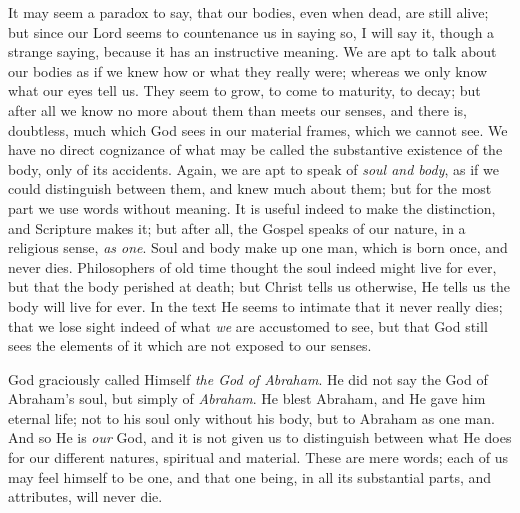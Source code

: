 It may seem a paradox to say, that our bodies, even when dead, are still alive; but since our Lord seems to
countenance us in saying so, I will say it, though a
strange saying, because it has an instructive meaning. We
are apt to talk about our bodies as if we knew how or
what they really were; whereas we only know what our eyes
tell us. They seem to grow, to come to maturity, to
decay; but after all we know no more about them than
meets our senses, and there is, doubtless, much which God
sees in our material frames, which we cannot see. We have
no direct cognizance of what may be called the
substantive existence of the body, only of its accidents.
Again, we are apt to speak of \emph{soul and body}, as if
we could distinguish between them, and knew much about
them; but for the most part we use words without meaning.
It is useful indeed to make the distinction, and
Scripture makes it; but after all, the Gospel speaks of
our nature, in a religious sense, \emph{as one}. Soul and
body make up one man, which is born once, and never dies.
Philosophers of old time thought the soul indeed might
live for ever, but that the body perished at death; but
Christ tells us otherwise, He tells us the body will live
for ever. In the text He seems to intimate that it never
really dies; that we lose sight indeed of what \emph{we}
are accustomed to see, but that God still sees the
elements of it which are not exposed to our senses.

God graciously called Himself \emph{the God of Abraham}.
He did not say the God of Abraham's soul, but simply of \emph{Abraham}.
He blest Abraham, and He gave him eternal life; not to
his soul only without his body, but to Abraham as one
man. And so He is \emph{our} God, and it is not given us
to distinguish between what He does for our different
natures, spiritual and material. These are mere words;
each of us may feel himself to be one, and that one
being, in all its substantial parts, and attributes, will
never die.

